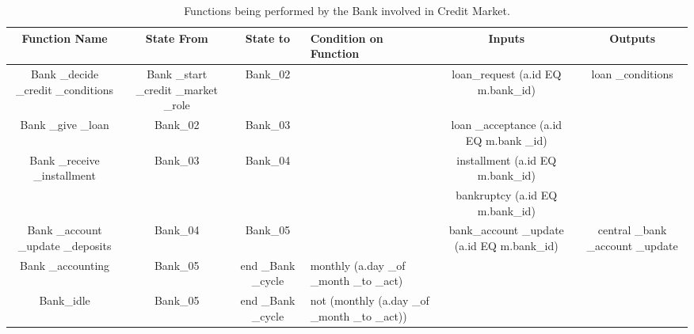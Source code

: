 \begin{landscape}
\begin{table}[!htb]\caption{Functions being performed by the Bank involved in Credit Market.}
\begin{center}
\begin{tabular}{|c|c|c|l|c|c|}
\hline
Function Name & State From & State to & Condition on Function & Inputs & Outputs\\
\hline

{\parbox[l]{3cm}{Bank \_decide \_credit \_conditions}} &
{\parbox[l]{3cm}{Bank \_start \_credit \_market \_role}} & Bank\_02
& & {\parbox[l]{3cm}{loan\_request (a.id EQ m.bank\_id)}} &
{\parbox[l]{3cm}{loan \_conditions}} \\

\hline

{\parbox[l]{3cm}{Bank \_give \_loan}} & Bank\_02 & Bank\_03 & &
{\parbox[l]{3cm}{loan \_acceptance (a.id EQ m.bank \_id)}} & \\

\hline

{\parbox[l]{3cm}{Bank \_receive \_installment}} & Bank\_03 &
Bank\_04 & &
{\parbox[l]{3cm}{installment (a.id EQ m.bank\_id)}} & \\

&&&&
{\parbox[l]{3cm}{bankruptcy (a.id EQ m.bank\_id)}} & \\

\hline


{\parbox[l]{3cm}{Bank \_account \_update \_deposits}} & Bank\_04 &
Bank\_05 & & {\parbox[l]{3cm}{bank\_account \_update (a.id EQ
m.bank\_id)}} &
{\parbox[l]{3cm}{central \_bank \_account \_update}}\\

\hline


{\parbox[l]{3cm}{Bank \_accounting}} & Bank\_05 &
{\parbox[l]{3cm}{end \_Bank \_cycle}} &
{\parbox[l]{4cm}{monthly (a.day \_of \_month \_to \_act)}}&  & \\

\hline


{\parbox[l]{3cm}{Bank\_idle}} & Bank\_05 & {\parbox[l]{3cm}{end
\_Bank \_cycle}} &
{\parbox[l]{4cm}{not (monthly (a.day \_of \_month \_to \_act))}}&  & \\
\hline


\end{tabular}\end{center}\label{tab:creditbankfn}
\end{table}
\end{landscape}

